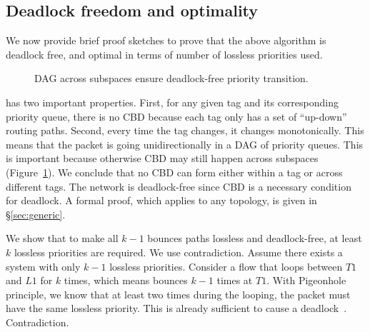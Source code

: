 \subsection {Deadlock freedom and optimality}
\label{subsec:specific_deadlock_free}

We now provide brief proof sketches to prove that the above algorithm is
deadlock free, and optimal in terms of number of lossless priorities used.

\begin{figure}[t]
	\centering
	
	
	\caption{DAG across subspaces ensure deadlock-free priority transition.}\label{fig:subspace}
\end{figure}

 \sysname{} has two
important properties. First, for any given tag and its corresponding priority
queue, there is no CBD because each tag only has a set of ``up-down'' routing
paths.  Second, every time the tag changes, it changes monotonically. This means
that the packet is going unidirectionally in a DAG of priority queues. This is
important because otherwise CBD may still happen across subspaces
(Figure~\ref{fig:subspace}).  We conclude that no CBD can form either within a
tag or across different tags.  The network is deadlock-free since CBD is a
necessary condition for deadlock.  A formal proof, which applies to any
topology, is given in \S\ref{sec:generic}.

 We show that
to make all $k-1$ bounces paths lossless and deadlock-free, at least $k$
lossless priorities are required. We use contradiction.  Assume there exists a
system with only $k-1$ lossless priorities. Consider a flow that loops between
$T1$ and $L1$ for $k$ times, which means bounces $k-1$ times at $T1$. With
Pigeonhole principle, we know that at least two times during the looping, the
packet must have the same lossless priority. This is already sufficient to cause
a deadlock~\cite{our_hotnets_paper}. Contradiction.

